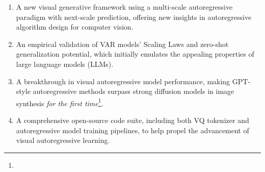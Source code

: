 \begin{enumerate}[topsep=3.5pt,itemsep=3pt,leftmargin=20pt]
\item A new visual generative framework using a multi-scale autoregressive paradigm with next-scale prediction, offering new insights in autoregressive algorithm design for computer vision.
\item An empirical validation of VAR models' Scaling Laws and zero-shot generalization potential, which initially emulates the appealing properties of large language models (LLMs).
\item A breakthrough in visual autoregressive model performance, making GPT-style autoregressive methods surpass strong diffusion models in image synthesis \textit{for the first time}\footnote{}.
\item A comprehensive open-source code suite, including both VQ tokenizer and autoregressive model training pipelines, to help propel the advancement of visual autoregressive learning.
\end{enumerate}
